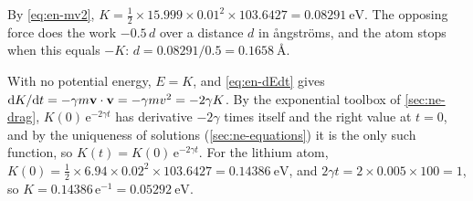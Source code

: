 By \cref{eq:en-mv2}, $K = \frac12\times15.999
\times0.01^2\times103.6427 = \SI{0.08291}{\electronvolt}$. The opposing
force does the work $-0.5\,d$ over a distance $d$ in \aa ngstr\"oms, and
the atom stops when this equals $-K$: $d = 0.08291/0.5 =
\SI{0.1658}{\angstrom}$.

With no potential energy, $E = K$, and
\cref{eq:en-dEdt} gives $\mathrm{d} K/\mathrm{d} t = -\gamma m\bm{\mathrm{v}}\cdot\bm{\mathrm{v}} =
-\gamma mv^2 = -2\gamma K$. By the exponential toolbox of
\cref{sec:ne-drag}, $K(0)\,\mathrm{e}^{-2\gamma t}$ has derivative
$-2\gamma$ times itself and the right value at $t = 0$, and by the
uniqueness of solutions (\cref{sec:ne-equations}) it is the only such
function, so $K(t) = K(0)\,\mathrm{e}^{-2\gamma t}$. For the lithium atom, $K(0) = \frac12
\times6.94\times0.02^2\times103.6427 = \SI{0.14386}{\electronvolt}$, and
$2\gamma t = 2\times0.005\times100 = 1$, so $K = 0.14386\,\mathrm{e}^{-1}
= \SI{0.05292}{\electronvolt}$.
